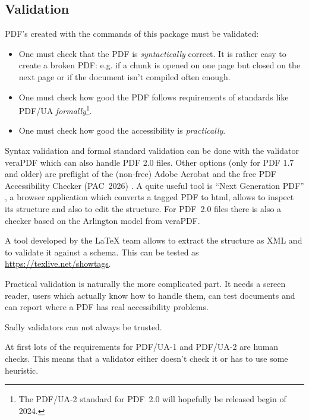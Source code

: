 \documentclass[bibliography=totoc,a4paper]{article}
\newcommand\PDF{PDF}
\begin{document}
\subsection{Validation}

\PDF{}'s created with the commands of this package must be validated:

\begin{itemize}
\item
 One must check that the \PDF{} is \emph{syntactically} correct. 
 It is rather easy to create a broken \PDF{}:
 e.g. if a chunk is opened on one page but closed 
 on the next page or if the document isn't compiled often enough.

\item One must check how good the PDF follows requirements of standards 
    like PDF/UA \emph{formally}\footnote{The PDF/UA-2 standard for \PDF~2.0 
    will hopefully be released begin of 2024.}. 

\item
One must check how good the accessibility is \emph{practically}.
\end{itemize}


Syntax validation and formal standard validation can be done with the
validator veraPDF \parencite{verapdf} which can also handle PDF 2.0 files. 
Other options (only for PDF 1.7 and older) are preflight of the (non-free) Adobe Acrobat and the free \PDF{} Accessibility Checker (PAC~2026) \parencite{pac2026}. 
A quite useful tool 
is \enquote{Next Generation PDF} \parencite{ngpdf}, a browser application 
which converts a tagged PDF to html, allows to inspect its structure and also 
to edit the structure. For PDF~2.0 files there is also a checker based on the 
Arlington model from veraPDF. 

A tool developed by the \LaTeX{} team allows to extract the structure as XML and to validate it against a schema. This can be tested as \url{https://texlive.net/showtags}.

Practical validation is naturally the more complicated part. 
It needs a screen reader, users which actually know how to handle them, 
can test documents and can report where a \PDF{} has real accessibility problems.



Sadly validators can not always be trusted. 

At first lots of the requirements for PDF/UA-1 and PDF/UA-2 are human checks.
This means that a validator either doesn't check it or has to use some heuristic.
\end{document}
